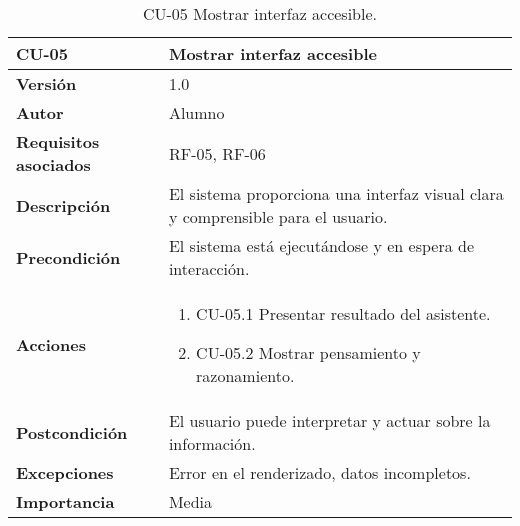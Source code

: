 \begin{table}[p]
    \centering
    \begin{tabularx}{\linewidth}{ p{} p{} }
        \toprule
        \textbf{CU-05}    & \textbf{Mostrar interfaz accesible}\\
        \toprule
        \textbf{Versión}              & 1.0 \\
        \textbf{Autor}                & Alumno \\
        \textbf{Requisitos asociados} & RF-05, RF-06 \\
        \textbf{Descripción}          & El sistema proporciona una interfaz visual clara y comprensible para el usuario.\\
        \textbf{Precondición}         & El sistema está ejecutándose y en espera de interacción.\\
        \textbf{Acciones}             &
        \begin{enumerate}
          \item CU-05.1 Presentar resultado del asistente.
          \item CU-05.2 Mostrar pensamiento y razonamiento.
        \end{enumerate}\\
        \textbf{Postcondición}        & El usuario puede interpretar y actuar sobre la información.\\
        \textbf{Excepciones}          & Error en el renderizado, datos incompletos.\\
        \textbf{Importancia}          & Media \\
        \bottomrule
    \end{tabularx}
    \caption{CU-05 Mostrar interfaz accesible.}
    \label{CU-05 Mostrar interfaz accesible}
\end{table}


